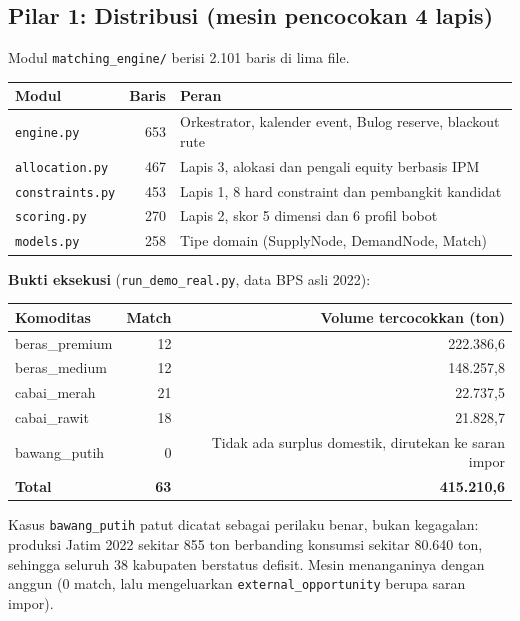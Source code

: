 \documentclass[11pt,a4paper]{article}
\newcommand{\code}[1]{\texttt{\small #1}}
\begin{document}
\subsection{Pilar 1: Distribusi (mesin pencocokan 4 lapis)}

Modul \code{matching\_engine/} berisi 2.101 baris di lima file.

\begin{center}
\begin{tabular}{@{}p{3.6cm}rp{9.6cm}@{}}
\toprule
\textbf{Modul} & \textbf{Baris} & \textbf{Peran} \\
\midrule
\code{engine.py}      & 653 & Orkestrator, kalender event, Bulog reserve, blackout rute \\
\code{allocation.py}  & 467 & Lapis 3, alokasi dan pengali equity berbasis IPM \\
\code{constraints.py} & 453 & Lapis 1, 8 hard constraint dan pembangkit kandidat \\
\code{scoring.py}     & 270 & Lapis 2, skor 5 dimensi dan 6 profil bobot \\
\code{models.py}      & 258 & Tipe domain (SupplyNode, DemandNode, Match) \\
\bottomrule
\end{tabular}
\end{center}

\noindent
\textbf{Bukti eksekusi} (\code{run\_demo\_real.py}, data BPS asli 2022):

\begin{center}
\begin{tabular}{@{}lrr@{}}
\toprule
\textbf{Komoditas} & \textbf{Match} & \textbf{Volume tercocokkan (ton)} \\
\midrule
beras\_premium & 12 & 222.386,6 \\
beras\_medium  & 12 & 148.257,8 \\
cabai\_merah   & 21 & 22.737,5 \\
cabai\_rawit   & 18 & 21.828,7 \\
bawang\_putih  & 0  & Tidak ada surplus domestik, dirutekan ke saran impor \\
\midrule
\textbf{Total} & \textbf{63} & \textbf{415.210,6} \\
\bottomrule
\end{tabular}
\end{center}

\noindent
Kasus \code{bawang\_putih} patut dicatat sebagai perilaku benar, bukan kegagalan: produksi Jatim
2022 sekitar 855 ton berbanding konsumsi sekitar 80.640 ton, sehingga seluruh 38 kabupaten
berstatus defisit. Mesin menanganinya dengan anggun (0 match, lalu mengeluarkan
\code{external\_opportunity} berupa saran impor).
\end{document}
